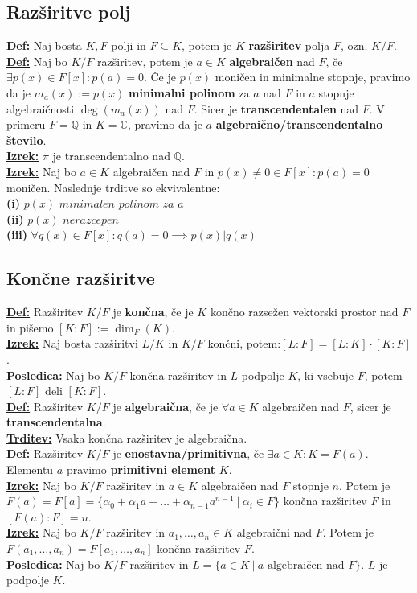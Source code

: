 \documentclass[a4paper,oneside,8pt,landscape]{extarticle}
\let\oldtextbf\textbf
\renewcommand{\textbf}[1]{\oldtextbf{\boldmath #1}}
\newcommand{\definicija}[1]{\textbf{\underline{Def:} }{#1}\\}
\newcommand{\trditev}[1]{\textbf{\underline{Trditev:} }{#1}\\}
\newcommand{\posledica}[1]{\textbf{\underline{Posledica:} }{#1}\\}
\newcommand{\izrek}[1]{\textbf{\underline{Izrek:} }{#1}\\}
\newcommand{\bt}[1]{\textbf{#1}}
\begin{document}
\begin{multicols*}{3}
\subsection*{Razširitve polj}
\definicija{Naj bosta $K,F$ polji in $F\subseteq K$, potem je $K$ \bt{razširitev} polja $F$, ozn. $K/F$.}
\definicija{Naj bo $K/ F$ razširitev, potem je $a\in K$ \bt{algebraičen} nad $F$, če $\exists p(x)\in F[x]: p(a)=0$. Če je $p(x)$ moničen in minimalne stopnje, pravimo da je $m_a(x):=p(x)$ \bt{minimalni polinom} za $a$ nad $F$ in $a$ stopnje algebraičnosti $\deg(m_a(x))$ nad $F$. Sicer je \bt{transcendentalen} nad $F$. V primeru $F=\mathbb{Q}$ in $K=\mathbb{C}$, pravimo da je $a$ \bt{algebraično/transcendentalno število}.}
\izrek{$\pi$ je transcendentalno nad $\mathbb{Q}$.}
\izrek{Naj bo $a\in K$ algebraičen nad $F$ in $p(x)\neq 0\in F[x]:p(a)=0$ moničen. Naslednje trditve so ekvivalentne:\\
\bt{(i)} $p(x) \textit{ minimalen polinom za a } $ \\
\bt{(ii)} $p(x) \textit{ nerazcepen }$ \\
\bt{(iii)} $\forall q(x)\in F[x]:q(a)=0\implies p(x)\vert q(x)$}
\vspace{-15pt}
\subsection*{Končne razširitve}
\definicija{Razširitev $K/F$ je \bt{končna}, če je $K$ končno razsežen vektorski prostor nad $F$ in pišemo $[K:F]:=\dim_F(K)$.}
\izrek{Naj bosta razširitvi $L/K$ in $K/F$ končni, potem:$[L:F] = [L:K]\cdot [K:F]$.}
\posledica{Naj bo $K/F$ končna razširitev in $L$ podpolje $K$, ki vsebuje $F$, potem $[L:F]$ deli $ [K:F].$}
\definicija{Razširitev $K/F$ je \bt{algebraična}, če je $\forall a\in K$ algebraičen nad $F$, sicer je \bt{transcendentalna}.}
\trditev{Vsaka končna razširitev je algebraična.}
\definicija{Razširitev $K/F$ je \bt{enostavna/primitivna}, če $\exists a\in K: K = F(a)$. Elementu $a$ pravimo \bt{primitivni element} $K$.}
\izrek{Naj bo $K/F$ razširitev in $a\in K$ algebraičen nad $F$ stopnje $n$. Potem je $F(a) = F[a] = \{\alpha_0 + \alpha_1a+\dots + \alpha_{n-1}a^{n-1} \ | \ \alpha_i \in F\}$ končna razširitev $F$ in $[F(a):F] = n$.}
\izrek{Naj bo $K/F$ razširitev in $a_1,\dots,a_n\in K$ algebraični nad $F$. Potem je $F(a_1,\dots,a_n) = F[a_1,\dots,a_n]$ končna razširitev $F$.}
\posledica{Naj bo $K/F$ razširitev in $L = \{a\in K \ | \ a \text{ algebraičen nad } F\}$. $L$ je podpolje $K$.}
\vspace{-15pt}

\end{multicols*}
\end{document}
